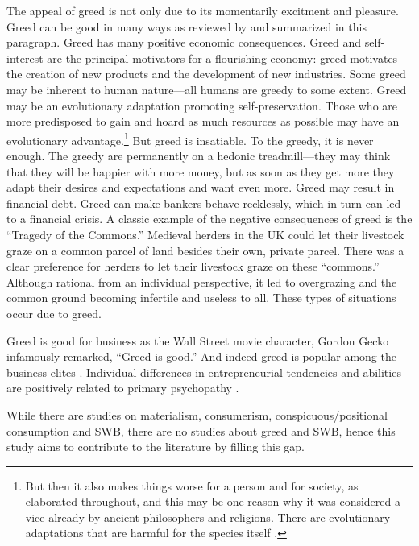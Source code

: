 \documentclass[10pt, letterpaper]{article}
\begin{document}
\begin{spacing}{1.8}
The appeal of greed is not only due to its momentarily excitment and pleasure. 
Greed can be good in many ways as reviewed by \citet{seuntjens15b} and
summarized in this paragraph. Greed has many positive economic consequences. Greed and self-interest are the principal motivators for a flourishing economy: greed motivates the creation of new
products and the development of new industries. 
Some greed may be inherent to human nature---all humans are greedy to some extent. %
Greed may be an evolutionary adaptation promoting self-preservation. Those who are more predisposed to gain and hoard as much resources as possible may have an
evolutionary advantage.\footnote{But then it also makes things worse for a person and for society, as elaborated throughout, and this may be one reason why
it was considered a vice already by ancient philosophers and religions. There are evolutionary adaptations that are harmful for the species itself \citep{frank12}.}
%
But greed is insatiable. To the greedy, it is never enough. The greedy are permanently on a hedonic treadmill---they may think that they will be happier
with more money, but as soon as they get more they adapt their desires and expectations and want even more.
%
Greed may result in financial debt. Greed can make  bankers behave recklessly, which in turn can led to a financial crisis. A classic example of the
negative consequences of greed is the ``Tragedy of the Commons.'' Medieval herders in the UK could let their livestock graze on a common parcel of land besides their own, private parcel. There was a clear preference
for herders to let their livestock graze on these ``commons.'' Although rational from an
individual perspective, it led to overgrazing and the common ground becoming infertile and useless to all.  These types of situations occur due to greed.



Greed is good for business as the Wall Street movie
 character, Gordon Gecko infamously remarked, ``Greed is good.'' And indeed greed is popular among the business elites \citep{robinson2009greed}.
Individual differences in entrepreneurial tendencies
and abilities are positively related to primary psychopathy \citep{akhtar2013greed} %
 \citep{feherrelationship}.

While there are studies on materialism, consumerism,
conspicuous/positional consumption and SWB, there are no studies about  %
greed %
and SWB, hence this study aims to contribute to the literature by filling this gap. 


\end{spacing}
\end{document}
